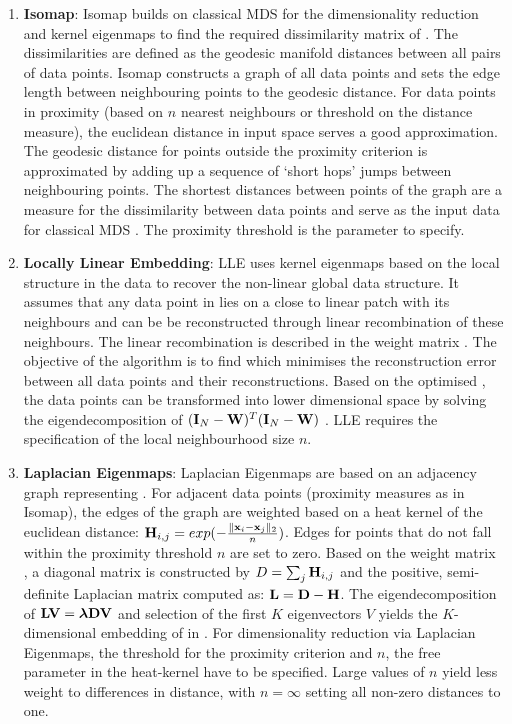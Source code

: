 \begin{enumerate}
\item\textbf{Isomap}: Isomap builds on classical MDS for the dimensionality reduction and kernel eigenmaps to find the required dissimilarity matrix of . The dissimilarities are defined as the geodesic manifold distances between all pairs of data points. Isomap constructs a graph of all data points and sets the edge length between neighbouring points to the geodesic distance. For data points in proximity (based on \(n\) nearest neighbours or threshold on the distance measure), the euclidean distance in input space serves a good approximation. The geodesic distance for points outside the proximity criterion is approximated by adding up a sequence of `short hops' jumps  between neighbouring points. The shortest distances between points of the graph are a measure for the dissimilarity between data points and serve as the input data for classical MDS \citep{Tenenbaum2000}. The proximity threshold is the parameter to specify. 

\item\textbf{Locally Linear Embedding}: LLE uses kernel eigenmaps based on the local structure in the data to recover the non-linear global data structure. It assumes that any data point in  lies on a close to linear patch with its neighbours and can be be reconstructed through linear recombination of these neighbours. The linear recombination is described in the weight matrix . The objective of the algorithm is to find  which minimises the reconstruction error between all data points and their reconstructions. Based on the optimised , the data points  can be transformed into lower dimensional space  by solving the eigendecomposition of \((\boldsymbol{\mathbf{I}}_{N} -\boldsymbol{\mathbf{W}})^T(\boldsymbol{\mathbf{I}}_{N} -\boldsymbol{\mathbf{W}})\) \citep{Roweis2000}. LLE requires the specification of the local neighbourhood size \(n\). 

\item\textbf{Laplacian Eigenmaps}: Laplacian Eigenmaps are based on an adjacency graph representing . For adjacent data points (proximity measures as in Isomap), the edges of the graph are weighted based on a heat kernel of the euclidean distance: \(\boldsymbol{\mathbf{H}}_{i,j}=exp(-\frac{\lVert \boldsymbol{\mathbf{x}}_{i} - \boldsymbol{\mathbf{x}}_{j}\rVert_2}{n})\). Edges for points that do not fall within the proximity threshold \(n\) are set to zero.  Based on the weight matrix , a diagonal matrix  is constructed by \(D = \sum_{j} \boldsymbol{\mathbf{H}}_{i,j}\) and the positive, semi-definite Laplacian matrix  computed as: \(\boldsymbol{\mathbf{L}} = \boldsymbol{\mathbf{D}} - \boldsymbol{\mathbf{H}}\). The eigendecomposition of \(\boldsymbol{\mathbf{LV}} = \boldsymbol{\mathbf{\lambda DV}}\) and selection of the first \(K\) eigenvectors \(V\) yields the \(K\)-dimensional embedding of  in  \citep{Belkin2003}. For dimensionality reduction via Laplacian Eigenmaps, the threshold for the proximity criterion and \(n\), the free parameter in the heat-kernel have to be specified. Large values of \(n\) yield less weight to differences in distance, with \(n=\infty\) setting all non-zero distances to one. 
 

\end{enumerate}
